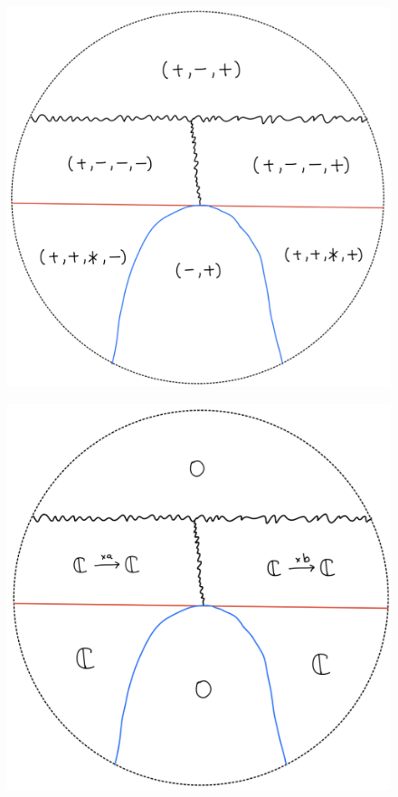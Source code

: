 \begin{figure}[H]
    \centering
    \includegraphics[scale = 0.45]{diagrams/lemma2/36.png} 
    \caption{}
    \label{fig:your-label}
\end{figure}
\begin{figure}[H]
    \centering
    \includegraphics[scale = 0.45]{diagrams/lemma2/37.png} 
    \caption{}
    \label{fig:your-label}
\end{figure}
